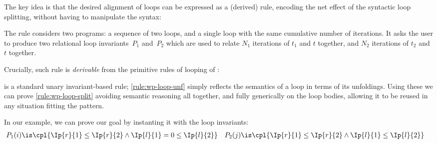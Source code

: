 The key idea is that the desired alignment of loops can be expressed
as a (derived) rule, encoding the net effect of the syntactic loop splitting,
without having to manipulate the syntax:
\begin{proofrule}
     \label{rule:wp-loop-split}
\end{proofrule}
The rule considers two programs: a sequence of two loops, and a single loop
with the same cumulative number of iterations.
It asks the user to produce two relational loop invariants~$P_1$ and~$P_2$
which are used to relate $N_1$ iterations of $t_1$ and $t$ together,
and $N_2$ iterations of $t_2$ and $t$ together.

Crucially,
such rule is \emph{derivable}
from the primitive rules of looping of \thelogic:
\begin{proofrules}\small
     \label{rule:wp-loop}

     \label{rule:wp-loop-unf}
\end{proofrules}
 is a standard unary invariant-based rule;
\ref{rule:wp-loop-unf} simply reflects the
semantics of a loop in terms of its unfoldings.
Using these
we can prove \ref{rule:wp-loop-split}
avoiding semantic reasoning all together,
and fully generically on the loop bodies,
allowing it to be reused in any situation fitting the pattern.

In our example, we can prove our goal by instanting it with the loop invariants:
\begin{align*}
  P_1(i) &\is
    \cpl{
      \Ip{r}{1}\leq\Ip{r}{2}
      \land
      \Ip{l}{1}=0\leq\Ip{l}{2}
    }
  &
  P_2(j) &\is
    \cpl{
      \Ip{r}{1}\leq\Ip{r}{2}
      \land
      \Ip{l}{1}\leq\Ip{l}{2}
    }
\end{align*}




